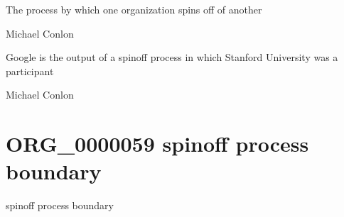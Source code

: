 \documentclass[letterpaper,10pt,english]{sphinxmanual}
\begin{document}
\begin{sphinxShadowBox}

\sphinxAtStartPar
The process by which one organization spins off of another
\end{sphinxShadowBox}

\begin{sphinxShadowBox}

\sphinxAtStartPar
Michael Conlon 
\end{sphinxShadowBox}

\begin{sphinxShadowBox}

\sphinxAtStartPar
Google is the output of a spin\sphinxhyphen{}off process in which Stanford University was a participant
\end{sphinxShadowBox}

\begin{sphinxShadowBox}

\sphinxAtStartPar
Michael Conlon 
\end{sphinxShadowBox}
\begin{quote}
\label{\detokenize{doc-ORG_0000059:org-0000059}}\label{\detokenize{doc-ORG_0000059:spin-off-process-boundary}}\label{\detokenize{doc-ORG_0000059:org-0000059}}
\ignorespaces \end{quote}


\section{ORG\_0000059 \sphinxhyphen{} spin\sphinxhyphen{}off process boundary}
\label{\detokenize{doc-ORG_0000059:org-0000059-spin-off-process-boundary}}\label{\detokenize{doc-ORG_0000059:index-0}}\label{\detokenize{doc-ORG_0000059::doc}}
\begin{sphinxShadowBox}

\sphinxAtStartPar
spin\sphinxhyphen{}off process boundary
\end{sphinxShadowBox}
\end{document}
